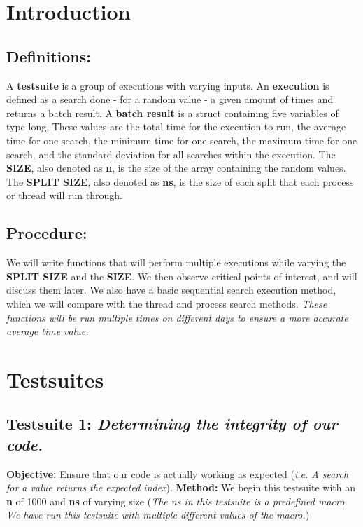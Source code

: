 \documentclass{article}
\title{\vspace{-0.5cm}\titletext}
\date{\vspace{-5ex}}
\begin{document}
    \maketitle
    \thispagestyle{fancy}
    \vspace{-1.0cm}

    \section{Introduction}
        \subsection{Definitions:}
            A \textbf{testsuite} is a group of executions with varying inputs. \newline
            An \textbf{execution} is defined as a search done - for a random value - a given amount of times and returns a batch result. \newline
            A \textbf{batch result} is a struct containing five variables of type long. These values are the total time for the execution to run, the average time for one search, the minimum time for one search, the maximum time for one search, and the standard deviation for all searches within the execution. \newline
            The \textbf{SIZE}, also denoted as \textbf{n}, is the size of the array containing the random values. \newline
            The \textbf{SPLIT SIZE}, also denoted as \textbf{ns}, is the size of each split that each process or thread will run through.
        \subsection{Procedure:} 
            We will write functions that will perform multiple executions while varying the \textbf{SPLIT SIZE} and the \textbf{SIZE}. We then observe critical points of interest, and will discuss them later. We also have a basic sequential search execution method, which we will compare with the thread and process search methods. \newline
            \textit{These functions will be run multiple times on different days to ensure a more accurate average time value.}
    \section{Testsuites}
        \subsection{Testsuite 1: \textit{Determining the integrity of our code.}}
            \textbf{Objective:} Ensure that our code is actually working as expected (\textit{i.e. A search for a value returns the expected index}). \newline
            \textbf{Method:} We begin this testsuite with an \textbf{n} of 1000 and \textbf{ns} of varying size (\textit{The ns in this testsuite is a predefined macro. We have run this testsuite with multiple different values of the macro.})
\end{document}
